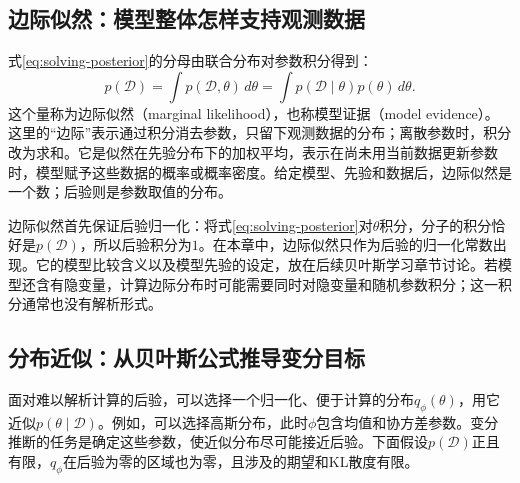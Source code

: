 \subsection{边际似然：模型整体怎样支持观测数据}
式\eqref{eq:solving-posterior}的分母由联合分布对参数积分得到：
\begin{equation}
 p(\mathcal D)=\int p(\mathcal D,\theta)\,d\theta
 =\int p(\mathcal D\mid\theta)p(\theta)\,d\theta.
 \label{eq:solving-model-evidence}
\end{equation}
这个量称为边际似然（marginal likelihood），也称模型证据（model evidence）。这里的“边际”表示通过积分消去参数，只留下观测数据的分布；离散参数时，积分改为求和。它是似然在先验分布下的加权平均，表示在尚未用当前数据更新参数时，模型赋予这些数据的概率或概率密度。给定模型、先验和数据后，边际似然是一个数；后验则是参数取值的分布。

边际似然首先保证后验归一化：将式\eqref{eq:solving-posterior}对$\theta$积分，分子的积分恰好是$p(\mathcal D)$，所以后验积分为$1$。在本章中，边际似然只作为后验的归一化常数出现。它的模型比较含义以及模型先验的设定，放在后续贝叶斯学习章节讨论。若模型还含有隐变量，计算边际分布时可能需要同时对隐变量和随机参数积分；这一积分通常也没有解析形式。

\subsection{分布近似：从贝叶斯公式推导变分目标}
面对难以解析计算的后验，可以选择一个归一化、便于计算的分布$q_\phi(\theta)$，用它近似$p(\theta\mid\mathcal D)$。例如，可以选择高斯分布，此时$\phi$包含均值和协方差参数。变分推断的任务是确定这些参数，使近似分布尽可能接近后验。下面假设$p(\mathcal D)$正且有限，$q_\phi$在后验为零的区域也为零，且涉及的期望和KL散度有限。

